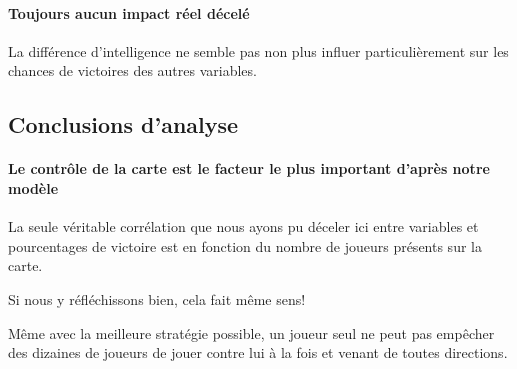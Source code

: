 \paragraph{Toujours aucun impact réel décelé}
La différence d'intelligence ne semble pas non plus influer particulièrement sur les chances de victoires des autres variables.


\subsection{Conclusions d'analyse}
\paragraph{Le contrôle de la carte est le facteur le plus important d'après notre modèle}
La seule véritable corrélation que nous ayons pu déceler ici entre variables et pourcentages de victoire est en fonction du nombre de joueurs présents sur la carte.

Si nous y réfléchissons bien, cela fait même sens! 

\begin{result}
	Même avec la meilleure stratégie possible, un joueur seul ne peut pas empêcher des dizaines de joueurs de jouer contre lui à la fois et venant de toutes directions.
\end{result}

